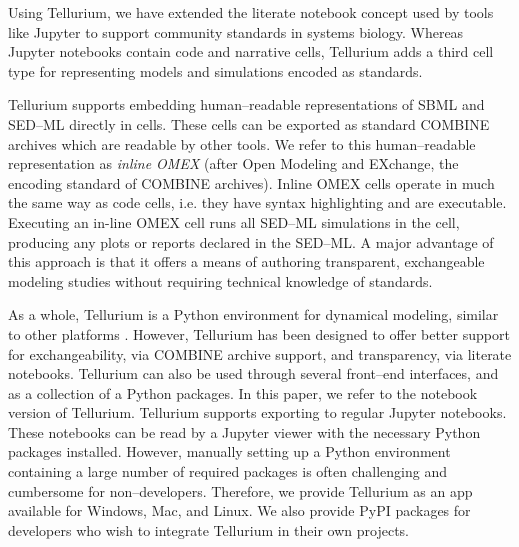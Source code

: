 \documentclass[10pt,letterpaper]{article}
\begin{document}
Using Tellurium, we have extended the literate notebook concept used by tools like Jupyter \cite{ragan2014jupyter} to support community standards in systems biology. Whereas Jupyter notebooks contain code and narrative cells, Tellurium adds a third cell type for representing models and simulations encoded as standards. %


Tellurium supports embedding human--readable representations of SBML \cite{smith2009antimony} and SED--ML \cite{choi2016phrased} directly in cells. These cells can be exported as standard COMBINE archives which are readable by other tools. We refer to this human--readable representation as \textit{inline OMEX} (after Open Modeling and EXchange, the encoding standard of COMBINE archives).
Inline OMEX cells operate in much the same way as code cells, i.e. they have syntax highlighting and are executable. Executing an in-line OMEX cell runs all SED--ML simulations in the cell, producing any plots or reports declared in the SED--ML. A major advantage of this approach is that it offers a means of authoring transparent, exchangeable modeling studies without requiring technical knowledge of standards.

As a whole, Tellurium is a Python environment for dynamical modeling, similar to other platforms \cite{olivier2005modelling}. However, Tellurium has been designed to offer better support for exchangeability, via COMBINE archive support, and transparency, via literate notebooks. Tellurium can also be used through several front--end interfaces, and as a collection of a Python packages. In this paper, we refer to the notebook version of Tellurium. Tellurium supports exporting to regular Jupyter notebooks. These notebooks can be read by a Jupyter viewer with the necessary Python packages installed. However, manually setting up a Python environment containing a large number of required packages is often challenging and cumbersome for non--developers. Therefore, we provide Tellurium as an app available for Windows, Mac, and Linux. We also provide PyPI packages for developers who wish to integrate Tellurium in their own projects.
\end{document}
